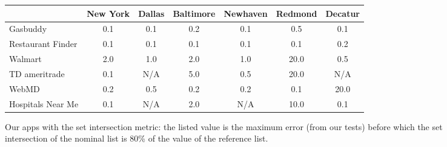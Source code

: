 \begin{figure*}
 \small
 \centering
 \begin{tabular}{|l||c|c|c|c|c|c|}
 \hline
 & New York & Dallas & Baltimore & Newhaven & Redmond & Decatur \\
 \hline
 \hline
 Gasbuddy & 0.1 & 0.1 & 0.2 & 0.1 & 0.5 & 0.1 \\
\hline
Restaurant Finder & 0.1 & 0.1 & 0.1 & 0.1 & 0.1 & 0.2 \\
\hline
Walmart & 2.0 & 1.0 & 2.0 & 1.0 & 20.0 & 0.5 \\
\hline
TD ameritrade & 0.1 & N/A & 5.0 & 0.5 & 20.0 & N/A \\
\hline
WebMD & 0.2 & 0.5 & 0.2 & 0.2 & 0.1 & 20.0 \\
\hline
Hospitals Near Me & 0.1 & N/A & 2.0 & N/A & 10.0 & 0.1 \\
\hline

\end{tabular}
 \caption{Our apps with the set intersection metric: the listed value is the maximum error
(from our tests) before which the set intersection of the nominal list is 80\% of the value of the reference list.}
 \label{fig:knee-points-set-finitediff}
\end{figure*}
